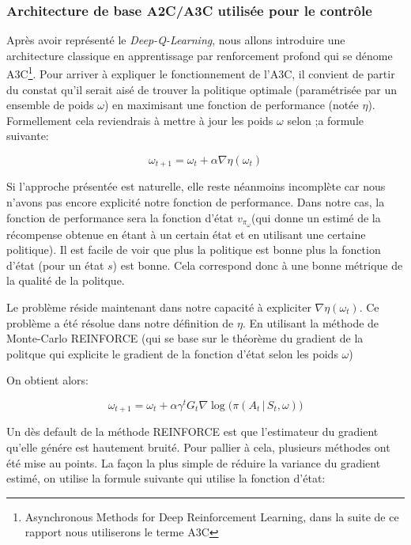 \subsubsection{Architecture de base A2C/A3C utilisée pour le contrôle}
Après avoir représenté le \emph{Deep-Q-Learning}, nous allons introduire une architecture classique en apprentissage par renforcement profond qui se dénome A3C\cite{DBLP:journals/corr/MnihBMGLHSK16}\footnote{Asynchronous Methods for Deep Reinforcement Learning, dans la suite de ce rapport nous utiliserons le terme A3C}. 
Pour arriver à expliquer le fonctionnement de l'A3C, il convient de partir du constat qu'il serait aisé de trouver la politique optimale (paramétrisée par un ensemble de poids $\omega$) en maximisant une fonction de performance (notée $\eta$). Formellement cela reviendrais à mettre à jour les poids $\omega$ selon ;a formule suivante:

\begin{equation}
    \omega_{t+1} = \omega_t + \alpha \nabla \eta(\omega_t)
\end{equation}

Si l'approche présentée  est naturelle, elle reste néanmoins incomplète car nous n'avons pas encore explicité notre fonction de performance. Dans notre cas, la fonction de performance sera la fonction d'état $v_{\pi_\omega}$(qui donne un estimé de la récompense obtenue en étant à un certain état et en utilisant une certaine politique). Il est facile de voir que plus la politique est bonne plus la fonction d'état (pour un état $s$) est bonne. Cela correspond donc à une bonne métrique de la qualité de la politque.


Le problème réside maintenant dans notre capacité à expliciter $\nabla\eta(\omega_t)$. Ce problème a été résolue dans notre définition de $\eta$. En utilisant la méthode de Monte-Carlo REINFORCE \cite{Williams1992} (qui se base sur le théorème du gradient de la politque \cite{policygradient} qui explicite le gradient de la fonction d'état selon les poids $\omega$) 

On obtient alors:

\begin{equation}
    \omega_{t+1} = \omega_t + \alpha \gamma^t G_t \nabla \log\big(\pi(A_t \,\vert\, S_t, \omega)\big)
\end{equation}

Un dès default de la méthode REINFORCE\cite{Williams1992} est que l'estimateur du gradient qu'elle génére est hautement bruité. Pour pallier à cela, plusieurs méthodes ont été mise au points.
La façon la plus simple de réduire la variance du gradient estimé, on utilise la formule suivante qui utilise la fonction d'état:

